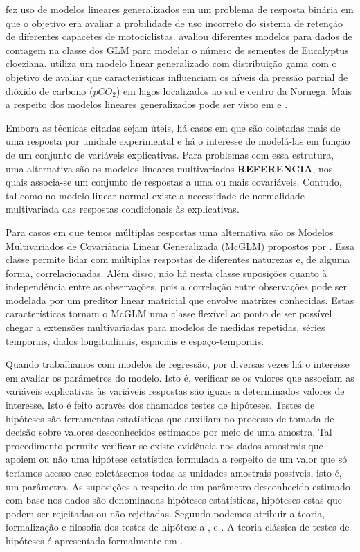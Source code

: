 \citet{capacete} fez uso de modelos lineares generalizados em um problema de resposta binária em que o objetivo era avaliar a probilidade de uso incorreto do sistema de retenção de diferentes capacetes de motociclistas. \citet{euc} avaliou diferentes modelos para dados de contagem na classe dos GLM para modelar o número de sementes de Eucalyptus cloeziana. \cite{pco2} utiliza um modelo linear generalizado com distribuição gama com o objetivo de avaliar que características influenciam os níveis da pressão
parcial de dióxido de carbono ($pCO_2$) em lagos localizados ao sul e centro da Noruega. Mais a respeito dos modelos lineares generalizados pode ser visto em \citet{paula} e \citet{cordeiro}.

Embora as técnicas citadas sejam úteis, há casos em que são coletadas mais de uma resposta por unidade experimental e há o interesse de modelá-las em função de um conjunto de variáveis explicativas. Para problemas com essa estrutura, uma alternativa são os modelos lineares multivariados \textbf{REFERENCIA}, nos quais associa-se um conjunto de respostas a uma ou mais covariáveis. Contudo, tal como no modelo linear normal existe a necessidade de normalidade multivariada das respostas condicionais às explicativas.

Para casos em que temos múltiplas respostas uma alternativa são os Modelos Multivariados de Covariância Linear Generalizada (McGLM) propostos por \citet{Bonat16}. Essa classe permite lidar com múltiplas respostas de diferentes naturezas e, de alguma forma, correlacionadas. Além disso, não há nesta classe suposições quanto à independência entre as observações, pois a correlação entre observações pode ser modelada por um preditor linear matricial que envolve matrizes conhecidas. Estas características tornam o McGLM uma classe flexível ao ponto de ser possível chegar a extensões multivariadas para modelos de medidas repetidas, séries temporais, dados longitudinais, espaciais e espaço-temporais.


Quando trabalhamos com modelos de regressão, por diversas vezes há o interesse em avaliar os parâmetros do modelo. Isto é, verificar se os valores que associam as variáveis explicativas às variáveis respostas são iguais a determinados valores de interesse. Isto é feito através dos chamados testes de hipóteses. Testes de hipóteses são ferramentas estatísticas que auxiliam no processo de tomada de decisão sobre valores desconhecidos estimados por meio de uma amostra. Tal procedimento permite verificar se existe evidência nos dados amostrais que apoiem ou não uma hipótese estatística formulada a respeito de um valor que só teríamos acesso caso coletássemos todas as unidades amostrais possíveis, isto é, um parâmetro. As suposições a respeito de um parâmetro desconhecido estimado com base nos dados são denominadas hipóteses estatísticas, hipóteses estas que podem ser rejeitadas ou não rejeitadas. Segundo \citet{lehmann} podemos atribuir a teoria, formalização e filosofia dos testes de hipótese a \citet{neyman1}, \cite{neyman2} e \cite{fisher}. A teoria clássica de testes de hipóteses é apresentada formalmente em \citet{lehmann2}.

